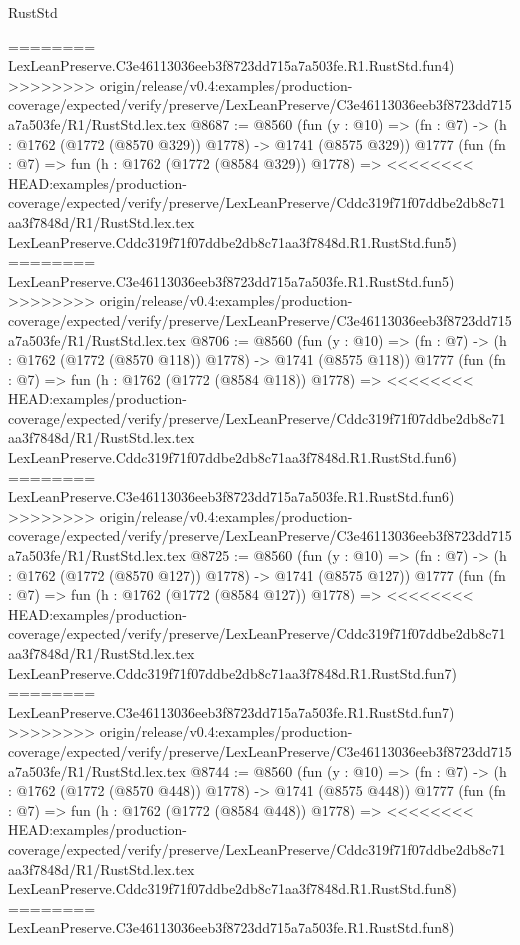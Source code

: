 \begin{lexlean}{RustStd}
\begin{coremodule}
{\begin{coremodule}
{{{{{{{{{{{{{{{========
    LexLeanPreserve.C3e46113036eeb3f8723dd715a7a503fe.R1.RustStd.fun4)
>>>>>>>> origin/release/v0.4:examples/production-coverage/expected/verify/preserve/LexLeanPreserve/C3e46113036eeb3f8723dd715a7a503fe/R1/RustStd.lex.tex
@8687 := @8560
    (fun (y : @10) => (fn : @7) -> (h : @1762 (@1772 (@8570 @329)) @1778) -> @1741 (@8575 @329))
    @1777
    (fun (fn : @7) =>
    fun (h : @1762 (@1772 (@8584 @329)) @1778) =>
<<<<<<<< HEAD:examples/production-coverage/expected/verify/preserve/LexLeanPreserve/Cddc319f71f07ddbe2db8c71aa3f7848d/R1/RustStd.lex.tex
    LexLeanPreserve.Cddc319f71f07ddbe2db8c71aa3f7848d.R1.RustStd.fun5)
========
    LexLeanPreserve.C3e46113036eeb3f8723dd715a7a503fe.R1.RustStd.fun5)
>>>>>>>> origin/release/v0.4:examples/production-coverage/expected/verify/preserve/LexLeanPreserve/C3e46113036eeb3f8723dd715a7a503fe/R1/RustStd.lex.tex
@8706 := @8560
    (fun (y : @10) => (fn : @7) -> (h : @1762 (@1772 (@8570 @118)) @1778) -> @1741 (@8575 @118))
    @1777
    (fun (fn : @7) =>
    fun (h : @1762 (@1772 (@8584 @118)) @1778) =>
<<<<<<<< HEAD:examples/production-coverage/expected/verify/preserve/LexLeanPreserve/Cddc319f71f07ddbe2db8c71aa3f7848d/R1/RustStd.lex.tex
    LexLeanPreserve.Cddc319f71f07ddbe2db8c71aa3f7848d.R1.RustStd.fun6)
========
    LexLeanPreserve.C3e46113036eeb3f8723dd715a7a503fe.R1.RustStd.fun6)
>>>>>>>> origin/release/v0.4:examples/production-coverage/expected/verify/preserve/LexLeanPreserve/C3e46113036eeb3f8723dd715a7a503fe/R1/RustStd.lex.tex
@8725 := @8560
    (fun (y : @10) => (fn : @7) -> (h : @1762 (@1772 (@8570 @127)) @1778) -> @1741 (@8575 @127))
    @1777
    (fun (fn : @7) =>
    fun (h : @1762 (@1772 (@8584 @127)) @1778) =>
<<<<<<<< HEAD:examples/production-coverage/expected/verify/preserve/LexLeanPreserve/Cddc319f71f07ddbe2db8c71aa3f7848d/R1/RustStd.lex.tex
    LexLeanPreserve.Cddc319f71f07ddbe2db8c71aa3f7848d.R1.RustStd.fun7)
========
    LexLeanPreserve.C3e46113036eeb3f8723dd715a7a503fe.R1.RustStd.fun7)
>>>>>>>> origin/release/v0.4:examples/production-coverage/expected/verify/preserve/LexLeanPreserve/C3e46113036eeb3f8723dd715a7a503fe/R1/RustStd.lex.tex
@8744 := @8560
    (fun (y : @10) => (fn : @7) -> (h : @1762 (@1772 (@8570 @448)) @1778) -> @1741 (@8575 @448))
    @1777
    (fun (fn : @7) =>
    fun (h : @1762 (@1772 (@8584 @448)) @1778) =>
<<<<<<<< HEAD:examples/production-coverage/expected/verify/preserve/LexLeanPreserve/Cddc319f71f07ddbe2db8c71aa3f7848d/R1/RustStd.lex.tex
    LexLeanPreserve.Cddc319f71f07ddbe2db8c71aa3f7848d.R1.RustStd.fun8)
========
    LexLeanPreserve.C3e46113036eeb3f8723dd715a7a503fe.R1.RustStd.fun8)
}}}}}}}}}}}}}}}
\end{coremodule}}
\end{coremodule}
\end{lexlean}
